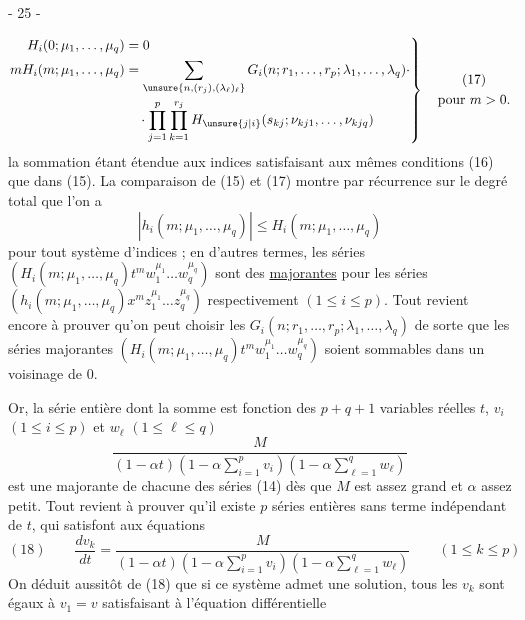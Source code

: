 
\begin{center}- 25 -\end{center}

\[
\left.
\begin{aligned}
H_i(0;\mu_1,\ldots,\mu_q)&=0\\
mH_i(m;\mu_1,\ldots,\mu_q)&=
\sum_{\unsure{n,(r_j),(\lambda_\ell)_\ell}}
G_i(n;r_1,\ldots,r_p;\lambda_1,\ldots,\lambda_q)\cdot\\
&\quad\cdot\prod_{j=1}^{p}\prod_{k=1}^{r_j}
H_{\unsure{j|i}}(s_{kj};\nu_{kj1},\ldots,\nu_{kjq})
\end{aligned}
\right\}\quad
\begin{gathered}(17)\\\text{pour }m>0.\end{gathered}
\]
la sommation étant étendue aux indices satisfaisant aux mêmes conditions (16) que dans (15).
La comparaison de (15) et (17) montre par récurrence sur le degré total que l'on a
\[
|h_i(m;\mu_1,\ldots,\mu_q)|\leq H_i(m;\mu_1,\ldots,\mu_q)
\]
pour tout système d'indices ; en d'autres termes, les séries
$(H_i(m;\mu_1,\ldots,\mu_q)t^m w_1^{\mu_1}\ldots w_q^{\mu_q})$
sont des \uline{majorantes} pour les séries
$(h_i(m;\mu_1,\ldots,\mu_q)x^m z_1^{\mu_1}\ldots z_q^{\mu_q})$
respectivement $(1\leq i\leq p)$.
Tout revient encore à prouver qu'on peut choisir les $G_i(n;r_1,\ldots,r_p;\lambda_1,\ldots,\lambda_q)$
de sorte que les séries majorantes
$(H_i(m;\mu_1,\ldots,\mu_q)t^m w_1^{\mu_1}\ldots w_q^{\mu_q})$
soient sommables dans un voisinage de $0$.

Or, la série entière dont la somme est fonction des $p+q+1$ variables réelles $t$, $v_i$ $(1\leq i\leq p)$ et $w_\ell$ $(1\leq\ell\leq q)$
\[
\frac{M}{(1-\alpha t)(1-\alpha\sum_{i=1}^{p}v_i)(1-\alpha\sum_{\ell=1}^{q}w_\ell)}
\]
est une majorante de chacune des séries (14) dès que $M$ est assez grand et $\alpha$ assez petit.
Tout revient à prouver qu'il existe $p$ séries entières sans terme indépendant de $t$, qui satisfont aux équations
\[
(18)\qquad
\frac{dv_k}{dt}=
\frac{M}{(1-\alpha t)(1-\alpha\sum_{i=1}^{p}v_i)(1-\alpha\sum_{\ell=1}^{q}w_\ell)}
\qquad(1\leq k\leq p)
\]
On déduit aussitôt de (18) que si ce système admet une solution, tous les $v_k$ sont égaux à $v_1=v$ satisfaisant à l'équation différentielle
